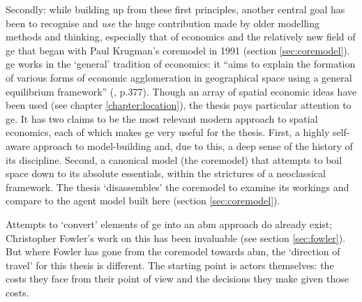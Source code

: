 Secondly: while building up from these first principles, another central goal has been to recognise and \emph{use} the huge contribution made by older modelling methods and thinking, especially that of economics and the relatively new field of \gls{ge} that began with Paul Krugman's \gls{coremodel} in 1991 (section \ref{sec:coremodel}). \gls{ge} works in the `general' tradition of economics: it ``aims to explain the formation of various forms of economic agglomeration in geographical space using a general equilibrium framework'' (\citealt{fujita_frontiers_2005}, p.377). Though an array of spatial economic ideas have been used (see chapter \ref{chapter:location}), the thesis pays particular attention to \gls{ge}. It has two claims to be the most relevant modern approach to spatial economics, each of which makes \gls{ge} very useful for the thesis. First, a highly self-aware approach to model-building and, due to this, a deep sense of the history of its discipline. Second, a canonical model (the \gls{coremodel}) that attempts to boil space down to its absolute essentials, within the strictures of a neoclassical framework. The thesis `disassembles' the \gls{coremodel} to examine its workings and compare to the agent model built here (section \ref{sec:coremodel}). 

Attempts to `convert' elements of \gls{ge} into an \gls{abm} approach do already exist; Christopher Fowler's work on this has been invaluable (see section \ref{sec:fowler}). But where Fowler has gone from the \gls{coremodel} towards \gls{abm}, the `direction of travel' for this thesis is different. The starting point is actors themselves: the costs they face from their point of view and the decisions they make given those costs. 

